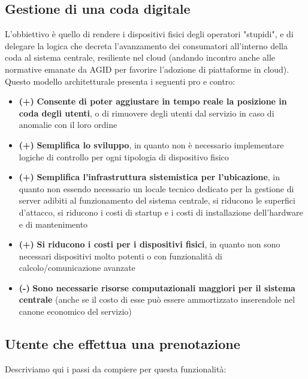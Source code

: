 \documentclass[a4paper, titlepage, 12pt, openright, twoside]{book}
\begin{document}
\subsection{Gestione di una coda digitale}
L'obbiettivo è quello di rendere i dispositivi fisici degli operatori "stupidi", e di delegare la logica che decreta l'avanzamento dei consumatori all'interno della coda al sistema centrale, resiliente nel cloud (andando incontro anche alle normative emanate da AGID per favorire l'adozione di piattaforme in cloud).
Questo modello architetturale presenta i seguenti pro e contro:
\begin{itemize}
	\item \textbf{(+)} \textbf{Consente di poter aggiustare in tempo reale la posizione in coda degli utenti}, o di rimuovere degli utenti dal servizio in caso di anomalie con il loro 						ordine
	\item \textbf{(+)} \textbf{Semplifica lo sviluppo}, in quanto non è necessario implementare logiche di controllo per ogni tipologia di dispositivo fisico
	\item \textbf{(+)} \textbf{Semplifica l'infrastruttura sistemistica per l'ubicazione}, in quanto non essendo necessario un locale tecnico dedicato per la gestione di server adibiti al funzionamento del sistema centrale, si riducono le superfici d'attacco, si riducono i costi di startup e i costi di installazione dell'hardware e di mantenimento
	\item \textbf{(+)} \textbf{Si riducono i costi per i dispositivi fisici}, in quanto non sono necessari dispositivi molto potenti o con funzionalità di calcolo/comunicazione avanzate
	\item \textbf{(-)} \textbf{Sono necessarie risorse computazionali maggiori per il sistema centrale} (anche se il costo di esse può essere ammortizzato inserendole nel canone economico del servizio)
\end{itemize}

\subsection{Utente che effettua una prenotazione}

Descriviamo qui i passi da compiere per questa funzionalità:
\end{document}
